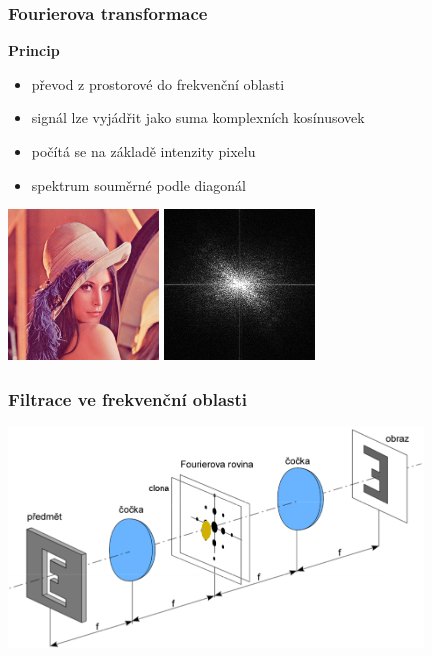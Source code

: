 \documentclass[10pt, xcolor=pdflatex, dvipsnames, table]{beamer}
\begin{document}
\begin{frame}
\frametitle{Fourierova transformace}

\textbf{Princip} 
\begin{itemize}
  \item převod z prostorové do frekvenční oblasti
  \item signál lze vyjádřit jako suma komplexních kosínusovek
  \item počítá se na základě intenzity pixelu
  \item spektrum souměrné podle diagonál
\end{itemize} 

\begin{center}
\includegraphics[width=4cm]{images/lena.png}
\hspace{1em}
\includegraphics[width=4cm]{images/lena_spec.png}
\end{center}
\end{frame}






\begin{frame}
\frametitle{Filtrace ve frekvenční oblasti}
\includegraphics[width=11cm]{images/dft.png}
\end{frame}
\end{document}
